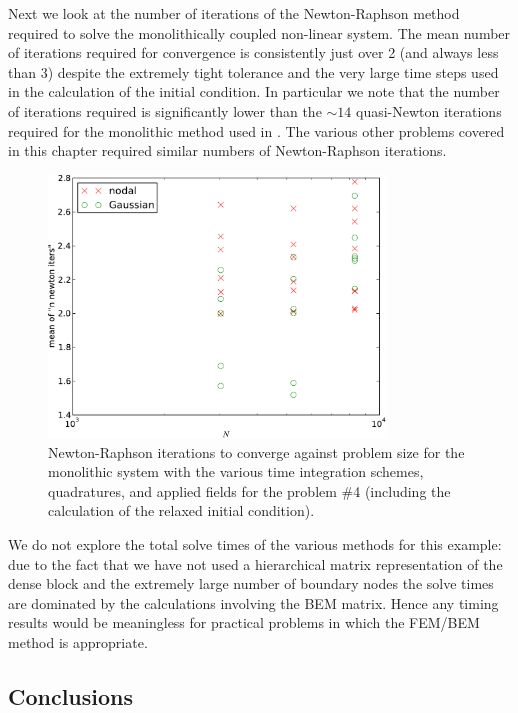 Next we look at the number of iterations of the Newton-Raphson method required to solve the monolithically coupled non-linear system.
The mean number of iterations required for convergence is consistently just over 2 (and always less than 3) despite the extremely tight tolerance and the very large time steps used in the calculation of the initial condition.
In particular we note that the number of iterations required is significantly lower than the $\sim 14$ quasi-Newton iterations required for the monolithic method used in \cite{DAquino2005}.
The various other problems covered in this chapter required similar numbers of Newton-Raphson iterations.

\begin{figure}
  \centering
  \includegraphics[width=0.8\textwidth]
  {plots/mumag4_monolithic_its/meanofnnewtonitersvsinitialnnode.pdf}
  \caption{Newton-Raphson iterations to converge against problem size
    for the monolithic system with the various time integration schemes, quadratures, and applied fields for the \mumag problem \#4 (including the calculation of the relaxed initial condition).}
  \label{fig:mumag4-newton-iters}
\end{figure}


We do not explore the total solve times of the various methods for this example:
due to the fact that we have not used a hierarchical matrix representation of the dense block and the extremely large number of boundary nodes the solve times are dominated by the calculations involving the BEM matrix.
Hence any timing results would be meaningless for practical problems in which the FEM/BEM method is appropriate.


\subsection{Conclusions}

